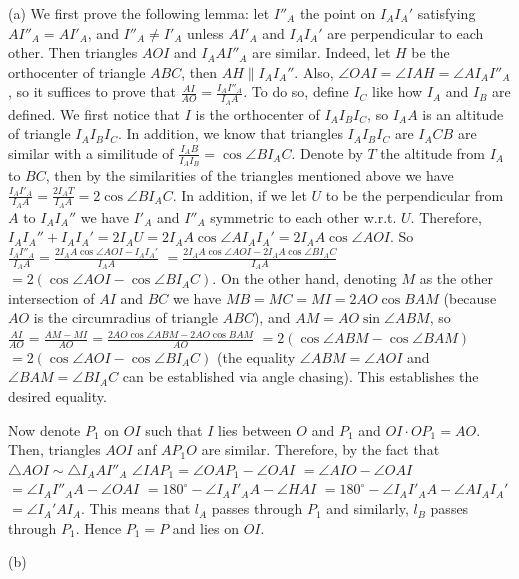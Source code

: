\documentclass[11pt,a4paper]{article}
\begin{document}
\begin{itemize}
(a) We first prove the following lemma: let $I''_A$ the point on $I_AI_A'$ satisfying $AI''_A=AI'_A$, and $I''_A\neq I'_A$ unless $AI'_A$ and $I_AI_A'$ are perpendicular to each other. Then triangles $AOI$ and $I_AAI''_A$ are similar. 
Indeed, let $H$ be the orthocenter of triangle $ABC$, then $AH\parallel I_AI_A''$. 
Also, $\angle OAI=\angle IAH=\angle AI_AI''_A$, so it suffices to prove that $\frac{AI}{AO}=\frac{I_AI''_A}{I_AA}$. 
To do so, define $I_C$ like how $I_A$ and $I_B$ are defined. 
We first notice that $I$ is the orthocenter of $I_AI_BI_C$, so $I_AA$ is an altitude of triangle $I_AI_BI_C$. 
In addition, we know that triangles $I_AI_BI_C$ are $I_ACB$ are similar with a similitude of $\frac {I_AB}{I_AI_B}=\cos\angle BI_AC$.
Denote by $T$ the altitude from $I_A$ to $BC$, then by the similarities of the triangles mentioned above we have 
$\frac {I_AI'_A}{I_AA}=\frac{2I_AT}{I_AA}=2\cos\angle BI_AC$. 
In addition, if we let $U$ to be the perpendicular from $A$ to $I_AI_A''$ we have $I'_A$ and $I''_A$ symmetric to each other w.r.t. $U$. 
Therefore, $I_AI_A''+I_AI_A'=2I_AU=2I_AA\cos\angle AI_AI_A'=2I_AA\cos\angle AOI$. 
So $\frac{I_AI''_A}{I_AA}=\frac{2I_AA\cos\angle AOI-I_AI_A'}{I_AA}$
$=\frac{2I_AA\cos\angle AOI-2I_AA\cos\angle BI_AC}{I_AA}$
$=2(\cos\angle AOI-\cos\angle BI_AC)$. 
On the other hand, denoting $M$ as the other intersection of $AI$ and $BC$ we have 
$MB=MC=MI=2AO\cos BAM$ (because $AO$ is the circumradius of triangle $ABC$), 
and $AM=AO\sin\angle ABM$, 
so $\frac{AI}{AO}=\frac{AM-MI}{AO}=\frac{2AO\cos\angle ABM-2AO\cos BAM}{AO}$
$=2(\cos\angle ABM-\cos\angle BAM)$
$=2(\cos\angle AOI-\cos\angle BI_AC)$
(the equality $\angle ABM=\angle AOI$ and $\angle BAM=\angle BI_AC$ can be established via angle chasing). 
This establishes the desired equality. 

Now denote $P_1$ on $OI$ such that $I$ lies between $O$ and $P_1$ and $OI\cdot OP_1=AO$. 
Then, triangles $AOI$ anf $AP_1O$ are similar. 
Therefore, by the fact that $\triangle AOI\sim \triangle I_AAI''_A$ $\angle IAP_1=\angle OAP_1-\angle OAI$
$=\angle AIO-\angle OAI$
$=\angle I_AI''_AA-\angle OAI$
$=180^{\circ}-\angle I_AI'_AA-\angle HAI$
$=180^{\circ}-\angle I_AI'_AA-\angle AI_AI_A'$
$=\angle I_A'AI_A$. 
This means that $l_A$ passes through $P_1$ and similarly, $l_B$ passes through $P_1$. Hence $P_1=P$ and lies on $OI$. 

(b) 


\end{itemize}
\end{document}
